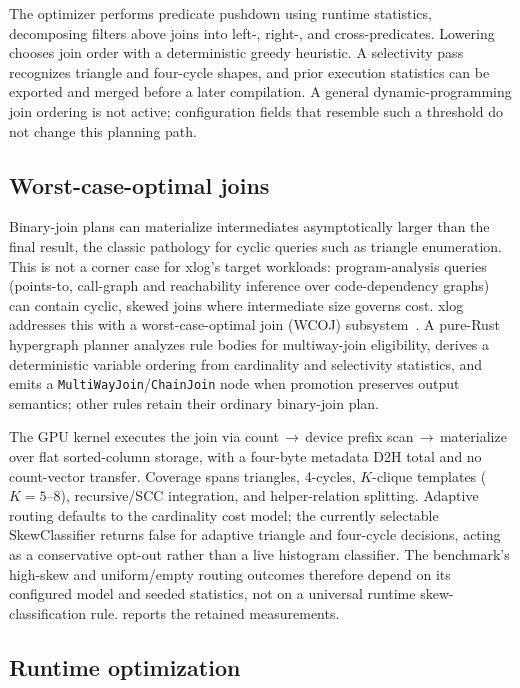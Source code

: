 The optimizer performs predicate pushdown using runtime statistics, decomposing filters above joins into left-, right-, and cross-predicates. Lowering chooses join order with a deterministic greedy heuristic. A selectivity pass recognizes triangle and four-cycle shapes, and prior execution statistics can be exported and merged before a later compilation. A general dynamic-programming join ordering is not active; configuration fields that resemble such a threshold do not change this planning path.

\subsection{Worst-case-optimal joins}

Binary-join plans can materialize intermediates asymptotically larger than the final result, the classic pathology for cyclic queries such as triangle enumeration. This is not a corner case for xlog's target workloads: program-analysis queries (points-to, call-graph and reachability inference over code-dependency graphs) can contain cyclic, skewed joins where intermediate size governs cost. xlog addresses this with a worst-case-optimal join (WCOJ) subsystem~\cite{ngo2018wcoj,veldhuizen2014leapfrog,wang2023freejoin}. A pure-Rust hypergraph planner analyzes rule bodies for multiway-join eligibility, derives a deterministic variable ordering from cardinality and selectivity statistics, and emits a \texttt{MultiWayJoin}/\texttt{ChainJoin} node when promotion preserves output semantics; other rules retain their ordinary binary-join plan.

The GPU kernel executes the join via count\,$\to$\,device prefix scan\,$\to$\,materialize over flat sorted-column storage, with a four-byte metadata D2H total and no count-vector transfer. Coverage spans triangles, 4-cycles, $K$-clique templates ($K{=}5$--$8$), recursive/SCC integration, and helper-relation splitting. Adaptive routing defaults to the cardinality cost model; the currently selectable SkewClassifier returns false for adaptive triangle and four-cycle decisions, acting as a conservative opt-out rather than a live histogram classifier. The benchmark's high-skew and uniform/empty routing outcomes therefore depend on its configured model and seeded statistics, not on a universal runtime skew-classification rule.  reports the retained measurements.

\subsection{Runtime optimization}

